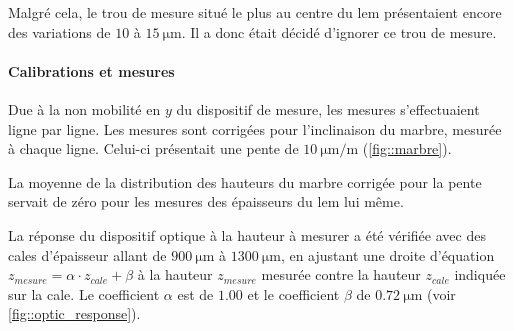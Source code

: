                     Malgré cela, le trou de mesure situé le plus au centre du \gls{lem} présentaient encore des variations de $10$ à $\SI{15}{\micro\meter}$. Il a donc était décidé d'ignorer ce trou de mesure.
                    
                \paragraph{Calibrations et mesures}
                
                    Due à la non mobilité en $y$ du dispositif de mesure, les mesures s'effectuaient ligne par ligne. Les mesures sont corrigées pour l'inclinaison du marbre, mesurée à chaque ligne. Celui-ci présentait une pente de $\SI{10}{\micro\meter\per\meter}$ (\autoref{fig::marbre}).
                    
                    La moyenne de la distribution des hauteurs du marbre corrigée pour la pente servait de zéro pour les mesures des épaisseurs du \gls{lem} lui même.
                    
                    La réponse du dispositif optique à la hauteur à mesurer a été vérifiée avec des cales d'épaisseur allant de $\SI{900}{\micro\meter}$ à $\SI{1300}{\micro\meter}$, en ajustant une droite d'équation $z_{mesure} = \alpha \cdot z_{cale} + \beta$ à la hauteur $z_{mesure}$ mesurée contre la hauteur $z_{cale}$ indiquée sur la cale. Le coefficient $\alpha$ est de $1.00$ et le coefficient $\beta$ de $\SI{0.72}{\micro\meter}$ (voir \autoref{fig::optic_response}).
                    
                    
